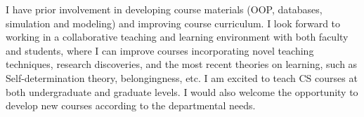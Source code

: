 \documentclass[11pt]{article}
\renewcommand*\paragraph[1]{}
\begin{document}
\paragraph{4) Teaching Experience of lot of credits.}

\paragraph{curriculum development for lecture and lab courses in Computer Science/Data Science}
I have prior involvement in developing course materials (OOP, databases, simulation and modeling) and improving course curriculum.
I look forward to working in a collaborative teaching and learning environment with both faculty and students, where I can improve courses incorporating novel teaching  techniques, research discoveries, and the most recent theories on learning, such as Self-determination theory, belongingness, etc. 
I am excited to teach CS courses at both undergraduate and graduate levels. 
I would also welcome the opportunity to develop new courses according to the departmental needs.

\paragraph{interdiscipliniary colab}

\paragraph{P4) The ability to contribute through teaching and/or service to the diversity, cultural sensitivity, and excellence of the academic community.}
\end{document}

